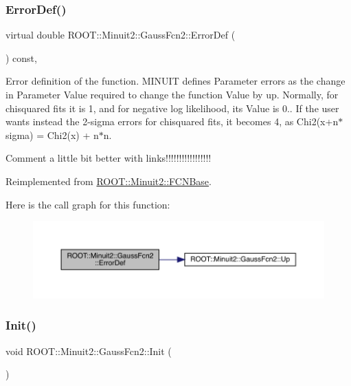 \subsubsection{\texorpdfstring{ErrorDef()}{ErrorDef()}}
{\footnotesize\ttfamily virtual double R\+O\+O\+T\+::\+Minuit2\+::\+Gauss\+Fcn2\+::\+Error\+Def (\begin{DoxyParamCaption}{ }\end{DoxyParamCaption}) const\hspace{0.3cm}{\ttfamily [inline]}, {\ttfamily [virtual]}}

Error definition of the function. M\+I\+N\+U\+IT defines Parameter errors as the change in Parameter Value required to change the function Value by up. Normally, for chisquared fits it is 1, and for negative log likelihood, its Value is 0.. If the user wants instead the 2-\/sigma errors for chisquared fits, it becomes 4, as Chi2(x+n$\ast$sigma) = Chi2(x) + n$\ast$n.

Comment a little bit better with links!!!!!!!!!!!!!!!!! 

Reimplemented from \mbox{\hyperlink{classROOT_1_1Minuit2_1_1FCNBase_ac4592475c58a65b037ba97ab5f3cba10}{R\+O\+O\+T\+::\+Minuit2\+::\+F\+C\+N\+Base}}.

Here is the call graph for this function\+:\nopagebreak
\begin{figure}[H]
\begin{center}
\leavevmode
\includegraphics[width=350pt]{da/d5d/classROOT_1_1Minuit2_1_1GaussFcn2_ac240f7b6ecbb7bf842d786e3914c620a_cgraph}
\end{center}
\end{figure}
\mbox{\label{classROOT_1_1Minuit2_1_1GaussFcn2_a4094daab77c76f30bacb299c5c3dfba4}} 
\subsubsection{\texorpdfstring{Init()}{Init()}}
{\footnotesize\ttfamily void R\+O\+O\+T\+::\+Minuit2\+::\+Gauss\+Fcn2\+::\+Init (\begin{DoxyParamCaption}{ }\end{DoxyParamCaption})\hspace{0.3cm}{\ttfamily [virtual]}}

